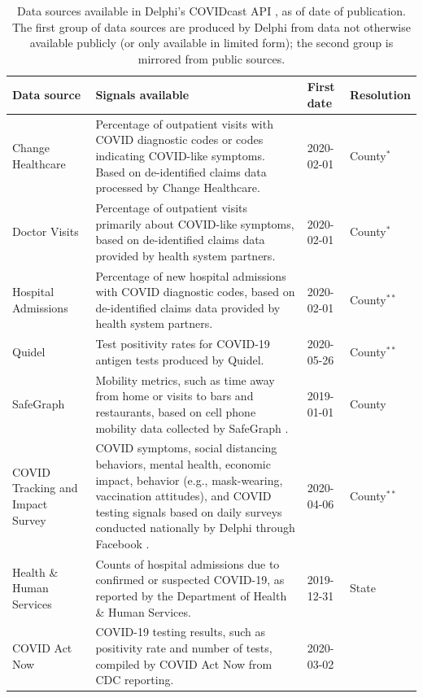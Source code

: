 \documentclass[9pt,twocolumn,twoside,lineno]{pnas-new}
\begin{document}
\begin{table}[t]
  \centering
  \caption{Data sources available in Delphi's COVIDcast API \cite{CovidcastAPI},
    as of date of publication. The first group of data sources are produced by
    Delphi from data not otherwise available publicly (or only available in
    limited form); the second group is mirrored from public sources.}
  \begin{tabular}{>{\raggedright}p{1.2in} p{4.0in} l >{\raggedright\arraybackslash}p{0.5in}}
    \toprule
    \textbf{Data source} & \textbf{Signals available} & \textbf{First date} &
\textbf{Resolution} \\\midrule
    Change Healthcare & Percentage of outpatient visits with COVID diagnostic
codes or codes indicating COVID-like symptoms. Based on de-identified claims
data processed by Change Healthcare. & 2020-02-01 & County$^*$ \\
    Doctor Visits & Percentage of outpatient visits primarily about COVID-like
symptoms, based on de-identified claims data provided by health system
partners. & 2020-02-01 & County$^*$ \\
    Hospital Admissions & Percentage of new hospital admissions with COVID
diagnostic codes, based on de-identified claims data provided by health system
partners. & 2020-02-01 & County$^{**}$\\
    Quidel & Test positivity rates for COVID-19 antigen tests produced by
Quidel. & 2020-05-26 & County$^{**}$ \\
    SafeGraph & Mobility metrics, such as time away from home or visits to bars 
and restaurants, based on cell phone mobility data collected by SafeGraph
\cite{SafeGraphSocial, SafeGraphPatterns}. & 2019-01-01 & County \\
    COVID Tracking and Impact Survey & COVID symptoms, social distancing
behaviors, mental health, economic impact, behavior (e.g., mask-wearing,
vaccination attitudes), and COVID testing signals based on daily surveys
conducted nationally by Delphi through Facebook \cite{DelphiSurvey,
Kreuter:2020}. & 2020-04-06 & County$^{**}$ \\
    \midrule
    Health \& Human Services & Counts of hospital admissions due to confirmed or 
suspected COVID-19, as reported by the Department of Health \& Human Services. &
2019-12-31 & State \\
    COVID Act Now & COVID-19 testing results, such as positivity rate and number
of tests, compiled by COVID Act Now from CDC reporting. & 2020-03-02 &

\end{tabular}
\end{table}
\end{document}

